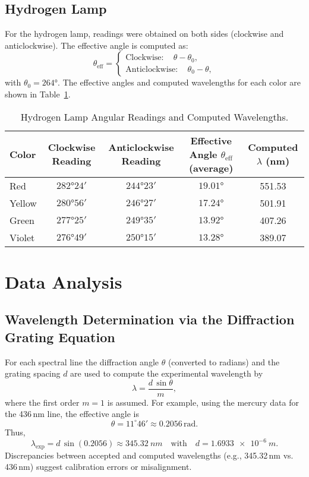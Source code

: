 \documentclass[12pt]{article}
\begin{document}
\subsection{Hydrogen Lamp}
For the hydrogen lamp, readings were obtained on both sides (clockwise and anticlockwise). The effective angle is computed as:
\[
\theta_{\text{eff}} = \begin{cases}
\text{Clockwise}: \quad \theta - \theta_0,\\[1mm]
\text{Anticlockwise}: \quad \theta_0 - \theta,
\end{cases}
\]
with \(\theta_0 = \ang{264}\). The effective angles and computed wavelengths for each color are shown in Table~\ref{tab:hydrogen}.

\begin{table}[H]
  \centering
  \caption{Hydrogen Lamp Angular Readings and Computed Wavelengths.}
  \begin{tabular}{lcccc}
    \toprule
    Color   & Clockwise Reading & Anticlockwise Reading & Effective Angle \(\theta_{\mathrm{eff}}\) (average) & Computed \(\lambda\) (nm) \\
    \midrule
    Red     & \(\ang{282;24}\) & \(\ang{244;23}\) & \(\ang{19.01}\) & 551.53 \\
    Yellow  & \(\ang{280;56}\) & \(\ang{246;27}\) & \(\ang{17.24}\) & 501.91 \\
    Green   & \(\ang{277;25}\) & \(\ang{249;35}\) & \(\ang{13.92}\) & 407.26 \\
    Violet  & \(\ang{276;49}\) & \(\ang{250;15}\) & \(\ang{13.28}\) & 389.07 \\
    \bottomrule
  \end{tabular}
  \label{tab:hydrogen}
\end{table}

\section{Data Analysis}
\subsection{Wavelength Determination via the Diffraction Grating Equation}
For each spectral line the diffraction angle \(\theta\) (converted to radians) and the grating spacing \(d\) are used to compute the experimental wavelength by
\[
\lambda = \frac{d\,\sin\theta}{m},
\]
where the first order \(m=1\) is assumed. For example, using the mercury data for the 436\,nm line, the effective angle is
\[
\theta = 11^\circ46' \approx 0.2056 \, \text{rad}.
\]
Thus, 
\[
\lambda_{\text{exp}} = d\,\sin(0.2056) \approx \SI{345.32}{nm} \quad \text{with} \quad d = \SI{1.6933e-6}{m}.
\]
Discrepancies between accepted and computed wavelengths (e.g., 345.32\,nm vs. 436\,nm) suggest calibration errors or misalignment.
\end{document}
